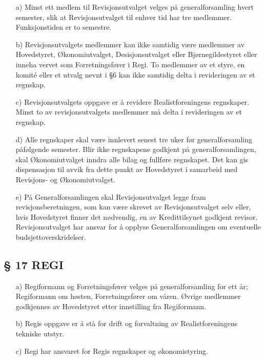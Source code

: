 \begin{itemize}
\item[a)] Minst ett medlem til Revisjonsutvalget velges på generalforsamling
hvert semester, slik at Revisjonsutvalget til enhver tid har tre
medlemmer. Funksjonstiden er to semestre.

\item[b)] Revisjonsutvalgets medlemmer kan ikke samtidig være medlemmer av
Hovedstyret, Økonomiutvalget, Desisjonsutvalget eller Bjørnegildestyret 
eller inneha vervet som Forretningsfører i Regi. To medlemmer av et 
styre, en komité eller et utvalg nevnt i §6 kan ikke samtidig delta i 
revideringen av et regnskap.

\item[c)] Revisjonsutvalgets oppgave er å revidere Realistforeningens
regnskaper. Minst to av revisjonsutvalgets medlemmer må delta i
revideringen av et regnskap.

\item[d)] Alle regnskaper skal være innlevert senest tre uker før
generalforsamling påfølgende semester. Blir ikke regnskapene godkjent
på generalforsamlingen, skal Økonomiutvalget inndra alle bilag og
fullføre regnskapet. Det kan gis dispensasjon til avvik fra dette
punkt av Hovedstyret i samarbeid med Revisjons- og Økonomiutvalget.

\item[e)] På Generalforsamlingen skal Revisjonsutvalget legge fram
revisjonsberetningen, som kan være skrevet av Revisjonsutvalget selv
eller, hvis Hovedstyret finner det nødvendig, en av Kredittilsynet
godkjent revisor.  Revisjonsutvalget har ansvar for å opplyse
Generalforsamlingen om eventuelle budsjettoverskridelser.
\end{itemize}


\subsection*{§ 17 REGI}

\begin{itemize}
\item[a)] Regiformann og Forretningsfører velges på generalforsamling for ett
år; Regiformann om høsten, Forretningsfører om våren.  Øvrige
medlemmer godkjennes av Hovedstyret etter innstilling fra Regiformann.

\item[b)] Regis oppgave er å stå for drift og forvaltning av
Realistforeningens tekniske utstyr.

\item[c)] Regi har ansvaret for Regis regnskaper og økonomistyring.
\end{itemize}



